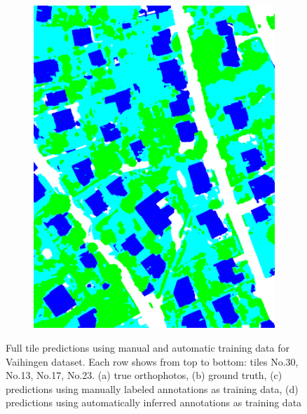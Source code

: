 \begin{figure}[htb]
\begin{subfigure}{0.24\textwidth}
   \includegraphics[width=1\linewidth]{fig/vai/23_auto.png}
   \caption{}
 \end{subfigure}
 \caption{Full tile predictions using manual and automatic training data for Vaihingen dataset. Each row shows from top to bottom: tiles No.30, No.13, No.17, No.23. (a) true orthophotos, (b) ground truth, (c) predictions using manually labeled annotations as training data, (d) predictions using automatically inferred annotations as training data}
 \label{fig:vai_seg}
 \end{figure}



